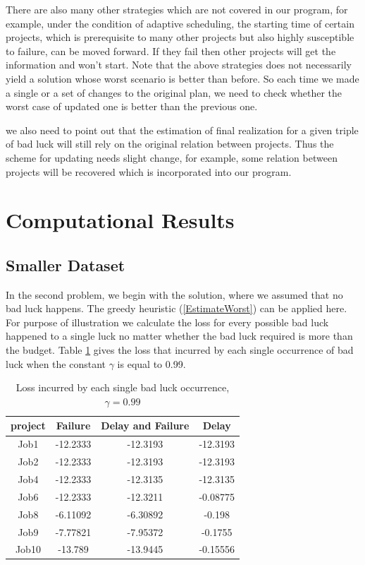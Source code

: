 \documentclass[final,3p,times]{elsarticle}
\begin{document}
There are also many other strategies which are not  covered in our program, for example, under the condition of adaptive scheduling, the starting time of certain projects, which is prerequisite to many other projects but also highly susceptible to failure, can be moved forward. If they fail then other projects will get the information and won't start. Note that the above strategies does not necessarily yield a solution whose worst scenario is better than before. So each time we made a single or a set of changes to the original plan, we need to check whether the worst case of updated one is better than the previous one.  

we also need to point out that the estimation of final realization for a given triple of bad luck will still rely on the original relation between projects. Thus the scheme for updating needs slight change, for example, some relation between projects will be recovered which is incorporated into our program.

\section{Computational Results}
\subsection{Smaller Dataset}
In the second problem, we begin with the solution, where we assumed that no bad luck happens. The greedy heuristic (\ref{EstimateWorst}) can be applied here. For purpose of illustration we calculate the loss for every possible bad luck happened to a single luck no matter whether the bad luck required is more than the budget. Table \ref{TableLossIncurGammap99} gives the loss that incurred by each single occurrence of bad luck when the constant $\gamma$ is equal to 0.99.

\begin{table}[H]
	\centering
	\begin{tabular}{|c|c|c|c|}
		\hline
		project & Failure & Delay and Failure & Delay \\
		\hline
		Job1 & -12.2333 & -12.3193 & -12.3193 \\
		\hline
		Job2 & -12.2333 & -12.3193 & -12.3193 \\
		\hline
		Job4 & -12.2333 & -12.3135 & -12.3135 \\
		\hline
		Job6 & -12.2333 & -12.3211 & -0.08775 \\
		\hline
		Job8 & -6.11092 & -6.30892 & -0.198 \\
		\hline
		Job9 & -7.77821 & -7.95372 & -0.1755 \\
		\hline
		Job10 & -13.789 & -13.9445 & -0.15556 \\
		\hline
	\end{tabular}
	\caption{Loss incurred by each single bad luck occurrence, $\gamma=0.99$}
	\label{TableLossIncurGammap99}
\end{table}
\end{document}
